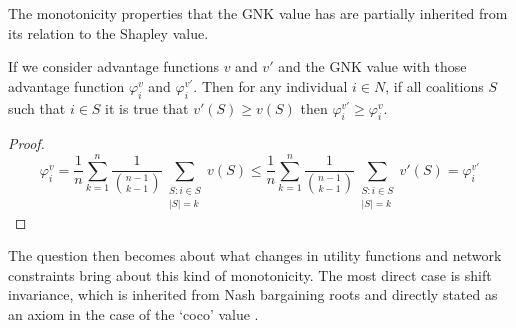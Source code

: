The monotonicity properties that the GNK value has are partially inherited from its relation to the Shapley value.

\begin{theorem}\label{thm:monotonicity}
If we consider advantage functions $v$ and $v'$ and the GNK value with those advantage function $\varphi^v_i$ and $\varphi^{v'}_i$.
Then for any individual $i\in N$, if all coalitions $S$ such that $i\in S$ it is true that $v'(S)\ge v(S)$ then $\varphi^{v'}_i \ge \varphi^v_i$.
\end{theorem}
\begin{proof}
$$\varphi^v_i = \frac{1}{n}\sum_{k=1}^n \frac{1}{\binom{n-1}{k-1}} \sum_{\substack{S:i\in S \\ |S|=k}}v(S) \le \frac{1}{n}\sum_{k=1}^n \frac{1}{\binom{n-1}{k-1}} \sum_{\substack{S:i\in S \\ |S|=k}}v'(S) =\varphi^{v'}_i$$
\end{proof}

The question then becomes about what changes in utility functions and network constraints bring about this kind of monotonicity. The most direct case is shift invariance, which is inherited from Nash bargaining roots \cite{nash2} and directly stated as an axiom in the case of the `coco' value \cite{kalai1}.

